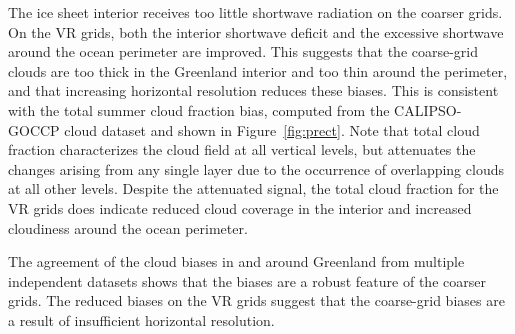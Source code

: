 \documentclass[draft]{agujournal2019}
\begin{document}
The ice sheet interior receives too little shortwave radiation on the coarser grids. On the VR grids, both the interior shortwave deficit and the excessive shortwave around the ocean perimeter are improved. This suggests that the coarse-grid clouds are too thick in the Greenland interior and too thin around the perimeter, and that increasing horizontal resolution reduces these biases. {\color{purple}{Marcus - This result is also consistent with the SMB bias in the GrSI interior that plagues low-res simulations. Is it worth commenting on that here?}}This is consistent with the total summer cloud fraction bias, computed from the CALIPSO-GOCCP cloud dataset  and shown in Figure~\ref{fig:prect}. Note that total cloud fraction characterizes the cloud field at all vertical levels, but attenuates the changes arising from any single layer due to the occurrence of overlapping clouds at all other levels. Despite the attenuated signal, the total cloud fraction for the VR grids does indicate reduced cloud coverage in the interior and increased cloudiness around the ocean perimeter. 

The agreement of the cloud biases in and around Greenland from multiple independent datasets shows that the biases are a robust feature of the coarser grids. The reduced biases on the VR grids suggest that the coarse-grid biases are a result of insufficient horizontal resolution.
\end{document}
